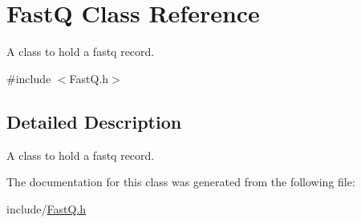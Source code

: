 \hypertarget{classFastQ}{}\section{FastQ Class Reference}
\label{classFastQ}


A class to hold a fastq record.  




{\ttfamily \#include $<$Fast\+Q.\+h$>$}



\subsection{Detailed Description}
A class to hold a fastq record. 

The documentation for this class was generated from the following file\+:\begin{DoxyCompactItemize}
\item 
include/\hyperlink{FastQ_8h}{Fast\+Q.\+h}\end{DoxyCompactItemize}
